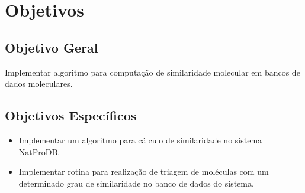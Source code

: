 \section{Objetivos}

\subsection{Objetivo Geral}

Implementar algoritmo para computação de similaridade molecular em bancos de dados moleculares.

\subsection{Objetivos Espec\'ificos}

\begin{itemize}
	\item Implementar um algoritmo para cálculo de similaridade no sistema NatProDB.
	\item Implementar rotina para realização de triagem de moléculas com um determinado grau de similaridade no banco de dados do sistema.
\end{itemize}


